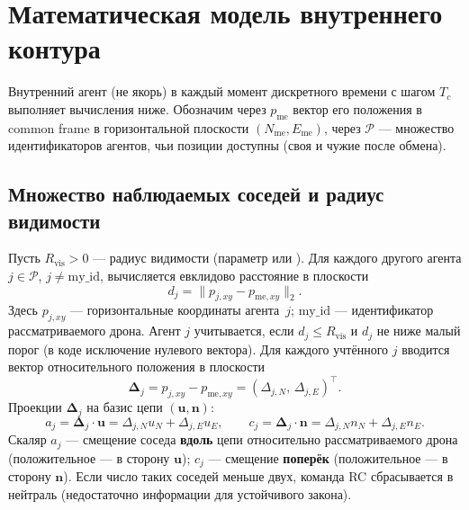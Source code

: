 \documentclass[a4paper,11pt]{article}
\newcommand{\code}[1]{\texttt{\detokenize{#1}}}
\begin{document}
\section{Математическая модель внутреннего контура}
\label{sec:internal}

Внутренний агент (не якорь) в каждый момент дискретного времени с шагом $T_c$ выполняет вычисления ниже. Обозначим через $p_{\mathrm{me}}$ вектор его положения в common frame в горизонтальной плоскости $(N_{\mathrm{me}},E_{\mathrm{me}})$, через $\mathcal{P}$ --- множество идентификаторов агентов, чьи позиции доступны (своя и чужие после обмена).

\subsection{Множество наблюдаемых соседей и радиус видимости}
Пусть $R_{\mathrm{vis}}>0$ --- радиус видимости (параметр \code{R\_VIS\_M} или \code{--r-vis}). Для каждого другого агента $j\in\mathcal{P}$, $j\neq \mathrm{my\_id}$, вычисляется евклидово расстояние в плоскости
\begin{equation}
d_j = \bigl\| p_{j,xy} - p_{\mathrm{me},xy} \bigr\|_2 .
\end{equation}
Здесь $p_{j,xy}$ --- горизонтальные координаты агента~$j$; $\mathrm{my\_id}$ --- идентификатор рассматриваемого дрона. Агент $j$ учитывается, если $d_j \le R_{\mathrm{vis}}$ и $d_j$ не ниже малый порог (в коде исключение нулевого вектора). Для каждого учтённого $j$ вводится вектор относительного положения в плоскости
\begin{equation}
\label{eq:Delta}
\boldsymbol{\Delta}_j = p_{j,xy} - p_{\mathrm{me},xy} = (\Delta_{j,N},\, \Delta_{j,E})^\top .
\end{equation}
Проекции $\boldsymbol{\Delta}_j$ на базис цепи $(\mathbf{u},\mathbf{n})$:
\begin{equation}
\label{eq:ajcj}
a_j = \boldsymbol{\Delta}_j\cdot \mathbf{u} = \Delta_{j,N} u_N + \Delta_{j,E} u_E,\qquad
c_j = \boldsymbol{\Delta}_j\cdot \mathbf{n} = \Delta_{j,N} n_N + \Delta_{j,E} n_E .
\end{equation}
Скаляр $a_j$ --- смещение соседа \textbf{вдоль} цепи относительно рассматриваемого дрона (положительное --- в сторону $\mathbf{u}$); $c_j$ --- смещение \textbf{поперёк} (положительное --- в сторону $\mathbf{n}$). Если число таких соседей меньше двух, команда RC сбрасывается в нейтраль (недостаточно информации для устойчивого закона).
\end{document}
